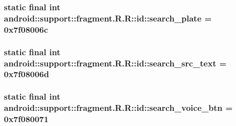 \hypertarget{classandroid_1_1support_1_1fragment_1_1_r_1_1id_148b2015d5c73a50873f3c0bcfb990f5}{
\subsubsection[{search\_\-plate}]{\setlength{\rightskip}{0pt plus 5cm}static final int android::support::fragment.R.R::id::search\_\-plate = 0x7f08006c}}
\label{classandroid_1_1support_1_1fragment_1_1_r_1_1id_148b2015d5c73a50873f3c0bcfb990f5}


\hypertarget{classandroid_1_1support_1_1fragment_1_1_r_1_1id_179a8b2b64c261cd2e189f82beefe36a}{
\subsubsection[{search\_\-src\_\-text}]{\setlength{\rightskip}{0pt plus 5cm}static final int android::support::fragment.R.R::id::search\_\-src\_\-text = 0x7f08006d}}
\label{classandroid_1_1support_1_1fragment_1_1_r_1_1id_179a8b2b64c261cd2e189f82beefe36a}


\hypertarget{classandroid_1_1support_1_1fragment_1_1_r_1_1id_a7f156558433a07699a4f2000653ef1e}{
\subsubsection[{search\_\-voice\_\-btn}]{\setlength{\rightskip}{0pt plus 5cm}static final int android::support::fragment.R.R::id::search\_\-voice\_\-btn = 0x7f080071}}
\label{classandroid_1_1support_1_1fragment_1_1_r_1_1id_a7f156558433a07699a4f2000653ef1e}


